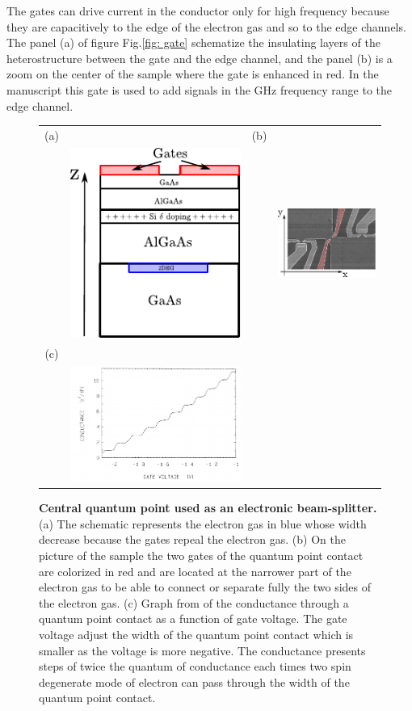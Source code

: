 The gates can drive current in the conductor only for high frequency because they are capacitively to the edge of the electron gas and so to the edge channels.
The panel (a) of figure Fig.\ref{fig: gate} schematize the insulating layers of the heterostructure between the gate and the edge channel, and the panel (b) is a zoom on the center of the sample where the gate is enhanced in red.
In the manuscript this gate is used to add signals in the GHz frequency range to the edge channel.

\begin{figure}[hptb]
	\begin{center}
		\begin{tabular}{c c c c}
			(a) & & (b) & \\
			& \includegraphics[width = 4 cm]{./intro/quantum_point_contact_cut_view}
			& &
			\includegraphics[width = 4 cm]{./intro/quantum_point_contact_top_view} \\
			(c) & &  & \\
			& \includegraphics[width = 4 cm]{./intro/quantum_of_conductance}
			& &
			
		\end{tabular}
	\end{center}
	
	\caption{\textbf{Central quantum point used as an electronic beam-splitter.} (a) The schematic represents the electron gas in blue whose width decrease because the gates repeal the electron gas. (b) On the picture of the sample the two gates of the quantum point contact are colorized in red and are located at the narrower part of the electron gas to be able to connect or separate fully the two sides of the electron gas. (c) Graph from \cite{van1988quantized} of the conductance through a quantum point contact as a function of gate voltage. The gate voltage adjust the width of the quantum point contact which is smaller as the voltage is more negative. The conductance presents steps of twice the quantum of conductance each times two spin degenerate mode of electron can pass through the width of the quantum point contact.}
	\label{fig: qpc}
\end{figure}

